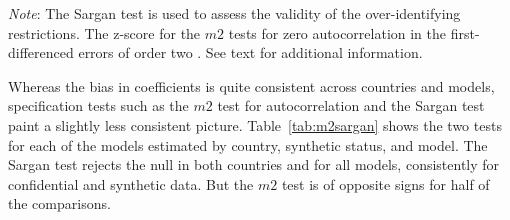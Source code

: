 \documentclass[10pt,twoside]{article}
\begin{document}
\begin{table}[!htbp] \centering 
  \caption{m2 and Sargan tests by country} 
  \label{tab:m2sargan} 
\begin{tablenotes}\footnotesize \item 
\textit{Note}: The Sargan test \parencite{blundell_estimation_2001,RePEc:oup:restud:v:58:y:1991:i:2:p:277-297.} is used to assess the validity of the over-identifying restrictions. The z-score for the $m2$ tests for zero autocorrelation in the  first-differenced errors of order two \parencite{RePEc:oup:restud:v:58:y:1991:i:2:p:277-297.}. See text for additional information.
\end{tablenotes}

\end{table} 
 

Whereas the bias in coefficients is quite consistent across countries and models, specification tests such as  the $m2$ test for autocorrelation and the Sargan test paint a slightly less consistent picture. Table~\ref{tab:m2sargan} shows the two tests for each of the models estimated by country, synthetic status, and model. The Sargan test rejects the null in both countries and for all models, consistently for confidential and synthetic data. But the $m2$ test is of opposite signs for half of the comparisons. 
\end{document}
